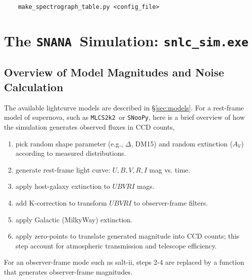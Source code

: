 \documentclass[12pt]{article}
\newcommand{\simexe}{{\tt snlc\_sim.exe}}
\newcommand{\mlcs}{{\tt MLCS2k2}}
\newcommand{\SALTII}{{\sc salt-ii}}
\newcommand{\snoopy}{{\tt SNooPy}}
\newcommand{\snana}{{\tt SNANA}}
\newcommand{\eff}{efficiency}
\begin{document}
{\begin{verbatim}
    make_spectrograph_table.py <config_file>
\end{verbatim}


   \clearpage
   \section{The \snana\ Simulation:  \simexe}
   \label{sec:snlc_sim}

   \subsection{Overview of Model Magnitudes and Noise Calculation }
   \label{subsec:overview}

The available lightcurve models are described in \S\ref{sec:models}.
For a rest-frame model of supernova, such as \mlcs\ or \snoopy,
here is a brief overview of how the simulation generates
observed fluxes in CCD counts,
%
\begin{enumerate}
  \item	pick random shape parameter (e.g., $\Delta$, DM15) 
        and random extinction ($A_V$) according to measured 
        distributions.
  \item	generate rest-frame light curve: $U,B,V,R,I$ mag vs. time.
  \item	apply host-galaxy extinction to $UBVRI$ mags.
  \item	add K-correction to transform $UBVRI$  to observer-frame filters.
  \item	apply Galactic (MilkyWay) extinction.
  \item	apply zero-points to translate generated magnitude into
        CCD counts; this step account for atmospheric transmission
        and telescope \eff.
\end{enumerate}
%
For an observer-frame mode such as \SALTII,
steps 2-4 are replaced by a function that generates
observer-frame magnitudes.

}
\end{document}
